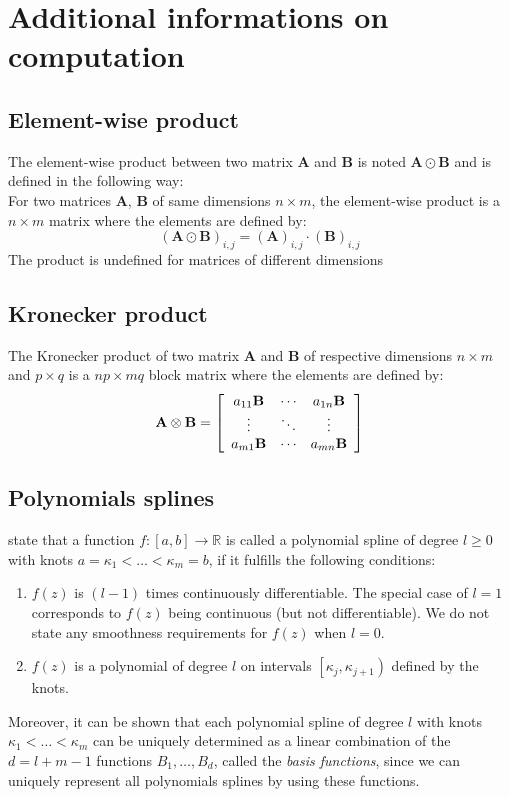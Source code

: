 \chapter{Additional informations on computation}
\label{appendix:add_info}
\section{Element-wise product}
\label{appendix:add_info_element_wise_product}
The element-wise product between two matrix $\mathbf{A}$ and $\mathbf{B}$ is noted $\mathbf{A} \odot \mathbf{B}$ and is defined in the following way:\\
For two matrices $\mathbf{A}$, $\mathbf{B}$ of same dimensions $n \times m$, the element-wise product is a $n \times m$ matrix where the elements are defined by:
\[(\mathbf{A} \odot \mathbf{B})_{i,j} = (\mathbf{A})_{i,j} \cdot (\mathbf{B})_{i,j}\]
The product is undefined for matrices of different dimensions

\section{Kronecker product}
\label{appendix:add_info_kronecker_product}
The Kronecker product of two matrix $\mathbf{A}$ and $\mathbf{B}$ of respective dimensions $n \times m$ and $p \times q$ is a $np \times mq$ block matrix where the elements are defined by:
\[\mathbf { A } \otimes \mathbf { B } = 
\left[ 
\begin{array}
 { c c c } { a _ { 11 } \mathbf { B } } & { \cdots } & { a _ { 1 n } \mathbf { B } } \\ { \vdots } & { \ddots } & { \vdots } \\ { a _ { m 1 } \mathbf { B } } & { \cdots } & { a _ { m n } \mathbf { B } } 
\end{array} 
\right]\] 

\section{Polynomials splines}
\label{appendix:polynomial_splines}
\textcite{fahrmeir_regression:_2013} state that a function $f : [ a , b ] \rightarrow \mathbb { R }$ is called a polynomial spline of degree $l \geq 0$ with knots $a = \kappa _ { 1 } < \ldots < \kappa _ { m } = b$, if it fulfills the following conditions:
\begin{enumerate}
\item $f(z)$ is $(l-1)$ times continuously differentiable. The special case of $l = 1$ corresponds to $f(z)$ being continuous (but not differentiable). We do not state any smoothness requirements for $f(z)$ when $l=0$.
\item $f(z)$ is a polynomial of degree $l$ on intervals $\left[ \kappa _ { j } , \kappa _ { j + 1 } \right)$ defined by the knots.
\end{enumerate}
Moreover, it can be shown that each polynomial spline of degree $l$ with
knots $\kappa _ { 1 } < \ldots < \kappa _ { m }$ can be uniquely determined as a linear combination of the $d = l+m-1$ functions
$B_1, \dots , B_d$, called the \textit{basis functions}, since we can uniquely represent all polynomials splines by using these functions.

